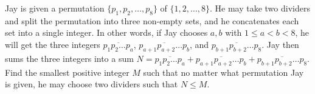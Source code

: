Jay is given a permutation $\{p_1, p_2,\ldots, p_8\}$ of $\{1, 2,\ldots, 8\}$. He may take two dividers and split the permutation into three non-empty sets, and he concatenates each set into a single integer. In other words, if Jay chooses $a,b$ with $1\le a< b< 8$, he will get the three integers $\overline{p_1p_2\ldots p_a}$, $\overline{p_{a+1}p_{a+2}\ldots p_{b}}$, and $\overline{p_{b+1}p_{b+2}\ldots p_8}$. Jay then sums the three integers into a sum $N=\overline{p_1p_2\ldots p_a}+\overline{p_{a+1}p_{a+2}\ldots p_b}+\overline{p_{b+1}p_{b+2}\ldots p_8}$. Find the smallest positive integer $M$ such that no matter what permutation Jay is given, he may choose two dividers such that $N\le M$.
